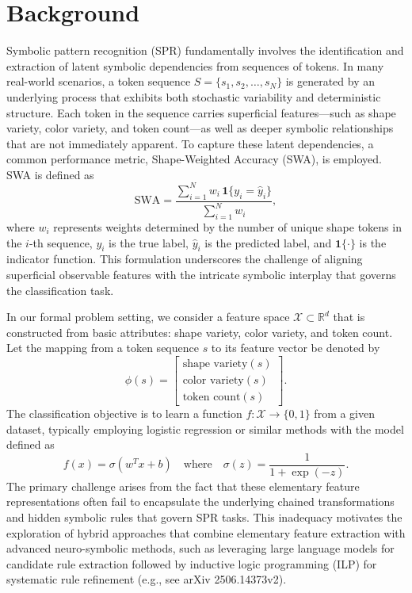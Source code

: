 \documentclass{article}
\begin{document}
\section{Background}
Symbolic pattern recognition (SPR) fundamentally involves the identification and extraction of latent symbolic dependencies from sequences of tokens. In many real-world scenarios, a token sequence \( S = \{s_1, s_2, \ldots, s_N\} \) is generated by an underlying process that exhibits both stochastic variability and deterministic structure. Each token in the sequence carries superficial features—such as shape variety, color variety, and token count—as well as deeper symbolic relationships that are not immediately apparent. To capture these latent dependencies, a common performance metric, Shape-Weighted Accuracy (SWA), is employed. SWA is defined as
\[
\text{SWA} = \frac{\sum_{i=1}^{N} w_i\, \mathbf{1}\{y_i = \hat{y}_i\}}{\sum_{i=1}^{N} w_i},
\]
where \( w_i \) represents weights determined by the number of unique shape tokens in the \( i \)-th sequence, \( y_i \) is the true label, \(\hat{y}_i\) is the predicted label, and \(\mathbf{1}\{\cdot\}\) is the indicator function. This formulation underscores the challenge of aligning superficial observable features with the intricate symbolic interplay that governs the classification task.

In our formal problem setting, we consider a feature space \(\mathcal{X} \subset \mathbb{R}^d\) that is constructed from basic attributes: shape variety, color variety, and token count. Let the mapping from a token sequence \( s \) to its feature vector be denoted by
\[
\phi(s) = \begin{bmatrix}
\text{shape variety}(s) \\
\text{color variety}(s) \\
\text{token count}(s)
\end{bmatrix}.
\]
The classification objective is to learn a function \( f: \mathcal{X} \rightarrow \{0,1\} \) from a given dataset, typically employing logistic regression or similar methods with the model defined as
\[
f(x) = \sigma(w^T x + b) \quad \text{where} \quad \sigma(z) = \frac{1}{1+\exp(-z)}.
\]
The primary challenge arises from the fact that these elementary feature representations often fail to encapsulate the underlying chained transformations and hidden symbolic rules that govern SPR tasks. This inadequacy motivates the exploration of hybrid approaches that combine elementary feature extraction with advanced neuro-symbolic methods, such as leveraging large language models for candidate rule extraction followed by inductive logic programming (ILP) for systematic rule refinement (e.g., see arXiv 2506.14373v2).
\end{document}
